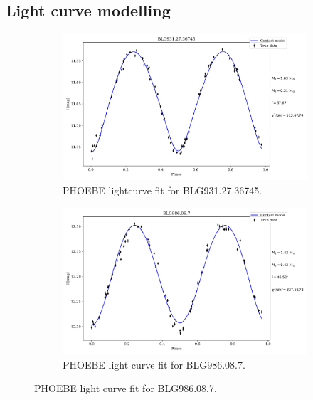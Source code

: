 \documentclass{pracalicmgr}
\begin{document}
\begin{appendices}
    \chapter{Light curve modelling}
    \begin{figure}[H]
        \centering
        \begin{adjustwidth}{-0.5in}{-0.5in}
        \begin{subfigure}{0.6\textwidth}
            \centering
            \includegraphics[width=1\textwidth]{plots/modeling_phoebe_contact_BLG931.27.36745.jpg}
            \caption{PHOEBE lightcurve fit for BLG931.27.36745. }
        \end{subfigure}
        \begin{subfigure}{0.6\textwidth}
            \centering
            \includegraphics[width=1\textwidth]{plots/modeling_phoebe_contact_BLG986.08.7.jpg}
            \caption{PHOEBE light curve fit for BLG986.08.7. }
        \end{subfigure}
        \end{adjustwidth}

\end{figure}
\end{appendices}
\end{document}
